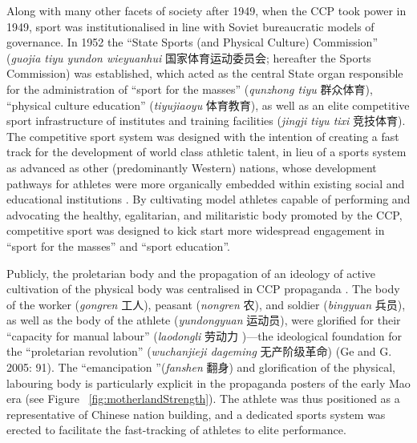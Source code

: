\begin{CJK}{UTF8}{gbsn}
 Along with many other facets of society after 1949, when the CCP took power in 1949, sport was institutionalised in line with Soviet bureaucratic models of governance.  In 1952 the ``State Sports (and Physical Culture) Commission'' (\textit{guojia tiyu yundon wieyuanhui} 国家体育运动委员会; hereafter the Sports Commission) was established, which acted as the central State organ responsible for the administration of ``sport for the masses'' (\textit{qunzhong tiyu} 群众体育), ``physical culture education'' (\textit{tiyujiaoyu} 体育教育), as well as an elite competitive sport infrastructure of institutes and training facilities (\textit{jingji tiyu tixi} 竞技体育).
 The competitive sport system was designed with the intention of creating a fast track for the development of world class athletic talent, in lieu of a sports system as advanced as other (predominantly Western) nations, whose development pathways for athletes were more organically embedded within existing social and educational institutions \citep{Brownell2008}.  By cultivating model athletes capable of performing and advocating the healthy, egalitarian, and militaristic body promoted by the CCP, competitive sport was designed to kick start more widespread engagement in ``sport for the masses'' and ``sport education''\citep[56]{Brownell1995}.

 Publicly, the proletarian body and the propagation of an ideology of active cultivation of the physical body was centralised in CCP propaganda \citep[58]{Brownell1995}.  The body of the worker (\textit{gongren} 工人), peasant (\textit{nongren} 农), and soldier (\textit{bingyuan} 兵员), as well as the body of the athlete (\textit{yundongyuan} 运动员), were glorified for their ``capacity for manual labour'' (\textit{laodongli} 劳动力 )---the ideological foundation for the ``proletarian revolution'' (\textit{wuchanjieji dageming} 无产阶级革命) (Ge and G. 2005: 91).
 The ``emancipation ''(\textit{fanshen} 翻身) and glorification of the physical, labouring body is particularly explicit in the propaganda posters of the early Mao era \citep[87]{Ge2005} (see Figure ~\ref{fig:motherlandStrength}).  The athlete was thus positioned as a representative of Chinese nation building, and a dedicated sports system was erected to facilitate the fast-tracking of athletes to elite performance.


\end{CJK}
